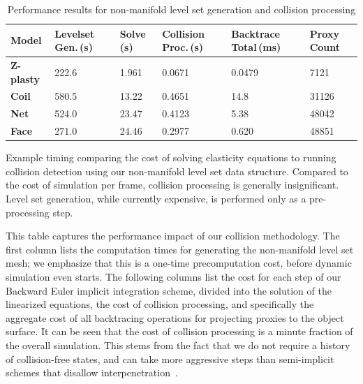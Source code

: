 \begin{table}[h!]
\begin{center}
\setlength\fboxsep{0pt}
\setlength\fboxrule{0.25pt}
\sffamily
\begin{tabular}{
 >{}l
 >{}m{2cm}
 >{}l 
 >{}m{2cm} 
 >{}m{2cm} 
 >{}m{1cm} }
\toprule
\textbf{Model}& \textbf{Level\;set Gen.\,(s)} & \textbf{Solve\,(s)} & \textbf{Collision Proc.\,(s)} & \textbf{Backtrace Total\,(ms)} & \textbf{Proxy Count}\\
\midrule
\textbf{Z-plasty}& 222.6 &  1.961 & 0.0671 & 0.0479 & 7121\\
\midrule
\textbf{Coil}& 580.5 & 13.22 & 0.4651 & 14.8 & 31126\\
\midrule
\textbf{Net}& 524.0 & 23.47 & 0.4123 & 5.38 & 48042\\
\midrule
\textbf{Face}& 271.0 & 24.46 & 0.2977 & 0.620 & 48851\\
\bottomrule
\end{tabular}
\end{center}
\vspace*{-.1in}
\caption{Performance results for non-manifold level set generation and
  collision processing}{Example timing comparing the cost of solving
  elasticity equations to running collision detection using our
  non-manifold level set data structure. Compared to the cost of
  simulation per frame, collision processing is generally
  insignificant. Level set generation, while currently expensive,
  is performed only as a pre-processing step.}
\label{tab:compute-times}
\end{table}


This table captures the performance impact of our collision
methodology. The first column lists the computation times for
generating the non-manifold level set mesh; we emphasize that this is
a one-time precomputation cost, before dynamic simulation even
starts. The following columns list the cost for each step of our
Backward Euler implicit integration scheme, divided into the solution
of the linearized equations, the cost of collision processing, and
specifically the aggregate cost of all backtracing operations for
projecting proxies to the object surface. It can be seen that the cost
of collision processing is a minute fraction of the overall
simulation. This stems from the fact that we do not require a history
of collision-free states, and can take more aggressive steps than
semi-implicit schemes that disallow
interpenetration~\cite{BridsFA:2002}.


